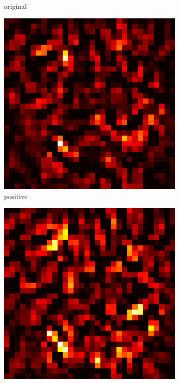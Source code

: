 \documentclass[preprint,12pt]{elsarticle}
\begin{document}
\begin{figure}
\begin{subfigure}{0.14\linewidth}
        \caption{original}
    \end{subfigure}
    \hfill
    \begin{subfigure}{0.14\textwidth}
        \centering
        \includegraphics[width=\linewidth]{../visualizations/examples/cifar10/resnet18/positive_saliency_map/1.png}
        \caption{positive}
    \end{subfigure}
    \hfill
    \begin{subfigure}{0.14\textwidth}
        \centering
        \includegraphics[width=\linewidth]{../visualizations/examples/cifar10/resnet18/negative_saliency_map/1.png}

\end{subfigure}
\end{figure}
\end{document}
